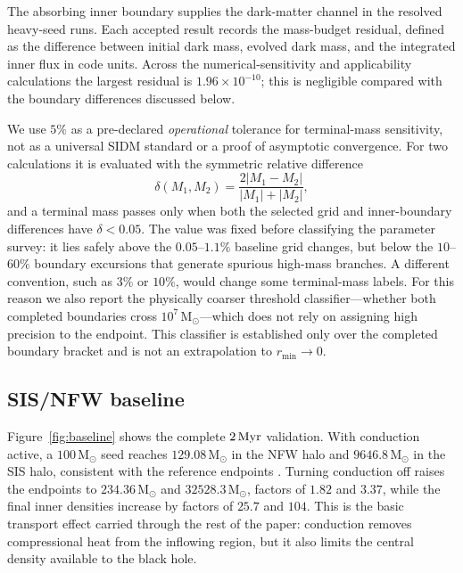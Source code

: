 \documentclass[11pt]{article}
\newcommand{\msun}{\,\mathrm{M}_{\odot}}
\begin{document}
The absorbing inner boundary supplies the dark-matter channel in the resolved heavy-seed runs.  Each accepted result records the mass-budget residual, defined as the difference between initial dark mass, evolved dark mass, and the integrated inner flux in code units.  Across the numerical-sensitivity and applicability calculations the largest residual is $1.96\times10^{-10}$; this is negligible compared with the boundary differences discussed below.

We use $5\%$ as a pre-declared \emph{operational} tolerance for terminal-mass sensitivity, not as a universal SIDM standard or a proof of asymptotic convergence.  For two calculations it is evaluated with the symmetric relative difference
\begin{equation}
 \delta(M_1,M_2)=\frac{2|M_1-M_2|}{|M_1|+|M_2|},
 \label{eq:tolerance}
\end{equation}
and a terminal mass passes only when both the selected grid and inner-boundary differences have $\delta<0.05$.  The value was fixed before classifying the parameter survey: it lies safely above the $0.05$--$1.1\%$ baseline grid changes, but below the $10$--$60\%$ boundary excursions that generate spurious high-mass branches.  A different convention, such as $3\%$ or $10\%$, would change some terminal-mass labels.  For this reason we also report the physically coarser threshold classifier---whether both completed boundaries cross $10^7\msun$---which does not rely on assigning high precision to the endpoint.  This classifier is established only over the completed boundary bracket and is not an extrapolation to $r_{\min}\rightarrow0$.

\subsection{SIS/NFW baseline}

Figure~\ref{fig:baseline} shows the complete $2\,{\rm Myr}$ validation.  With conduction active, a $100\msun$ seed reaches $129.08\msun$ in the NFW halo and $9646.8\msun$ in the SIS halo, consistent with the reference endpoints \citep{Meng2026}.  Turning conduction off raises the endpoints to $234.36\msun$ and $32528.3\msun$, factors of $1.82$ and $3.37$, while the final inner densities increase by factors of $25.7$ and $104$.  This is the basic transport effect carried through the rest of the paper: conduction removes compressional heat from the inflowing region, but it also limits the central density available to the black hole.
\end{document}
